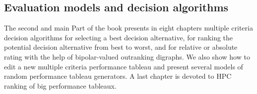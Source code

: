 % 
%
%

\begin{partbacktext}
  \part{Evaluation models and decision algorithms}

  The second and main Part of the book presents in eight chapters multiple criteria decision algorithms for selecting a best decision alternative, for ranking the potential decision alternative from best to worst, and for relative or absolute rating with the help of bipolar-valued outranking digraphs. We also show how to edit a new multiple criteria performance tableau and present several models of random performance tableau generators. A last chapter is devoted to HPC ranking of big performance tableaux.
\end{partbacktext}